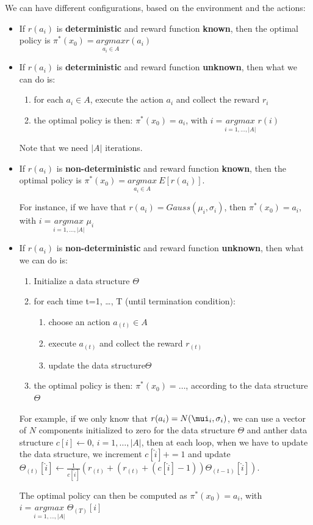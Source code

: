 We can have different configurations, based on the environment and the actions:
\begin{itemize}
    \item If $r(a_{i})$ is \textbf{deterministic} and reward function \textbf{known}, then the optimal policy is $\pi^{*}(x_{0}) = \underset{a_{i} \in A}{argmax} r(a_{i})$
    \item If $r(a_{i})$ is \textbf{deterministic} and reward function \textbf{unknown}, then what we can do is:
    \begin{enumerate}
        \item for each $a_{i} \in A$, execute the action $a_{i}$ and collect the reward $r_{i}$
        \item the optimal policy is then: $\pi^{*}(x_{0}) = a_{i}$, with $i = \underset{i=1, \dots, |A|}{argmax}\ r(i)$
    \end{enumerate}
    Note that we need $|A|$ iterations.
    \item If $r(a_{i})$ is \textbf{non-deterministic} and reward function \textbf{known}, then the optimal policy is $\pi^{*}(x_{0}) = \underset{a_{i} \in A}{argmax}\ E[r(a_{i})]$. 

    For instance, if we have that $r(a_{i}) = Gauss(\mu_{i}, \sigma_{i})$, then $\pi^{*}(x_{0}) = a_{i}$, with $i = \underset{i=1, \dots, |A|}{argmax}\ \mu_{i}$

    \item If $r(a_{i})$ is \textbf{non-deterministic} and reward function \textbf{unknown}, then what we can do is:
    \begin{enumerate}
        \item Initialize a data structure $\Theta$
        \item for each time t=1, \dots, T (until termination condition):
        \begin{enumerate}
            \item choose an action $a_{(t)} \in A$
            \item execute $a_{(t)}$ and collect the reward $r_{(t)}$
            \item update the data structure$\Theta$
        \end{enumerate}
        \item the optimal policy is then: $\pi^{*}(x_{0}) = \dots$, according to the data structure $\Theta$
    \end{enumerate}
    
    For example, if we only know that $r(a_{i}) = N(\mui_{i}, \sigma_{i})$, we can use a vector of $N$ components initialized to zero for the data structure $\Theta$ and anther data structure $c[i] \xleftarrow{} 0$, $i=1,\dots, |A|$, then at each loop, when we have to update the data structure, we increment $c[\hat{i}] += 1$ and update $\Theta_{(t)}[\hat{i}] \xleftarrow{} \frac{1}{c[\hat{i}]} \left(r_{(t)} + \left( r_{(t)} + \left( c[\hat{i}] - 1 \right) \right) \Theta_{(t-1)}[\hat{i}]\right)$.

    The optimal policy can then be computed as $\pi^{*}(x_{0}) = a_{i}$, with $i = \underset{i=1, \dots, |A|}{argmax}\ \Theta_{(T)}[i]$
\end{itemize}

